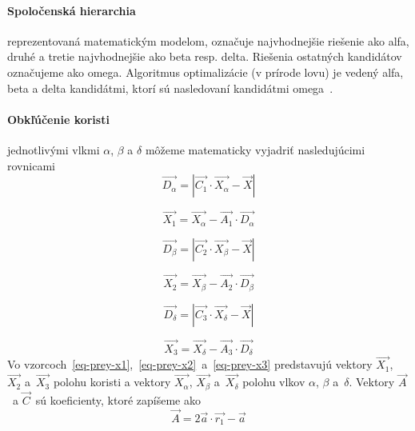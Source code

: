 \documentclass[a4paper,slovak,12pt,appendix]{article}
\begin{document}
\paragraph{Spoločenská hierarchia} reprezentovaná matematickým modelom,
označuje najvhodnejšie riešenie ako alfa, druhé a tretie najvhodnejšie ako beta
resp. delta. Riešenia ostatných kandidátov označujeme ako omega. Algoritmus
optimalizácie (v prírode lovu) je vedený alfa, beta a delta kandidátmi, ktorí
sú nasledovaní kandidátmi omega~\cite{Seeley1991}.

\paragraph{Obkľúčenie koristi} jednotlivými vlkmi $\alpha$, $\beta$ a $\delta$
môžeme matematicky vyjadriť nasledujúcimi rovnicami
\begin{equation}
  \vec{D_\alpha} = | \vec{C_1} \cdot \vec{X_\alpha} - \vec{X} |
  \label{eq-prey-alpha}
\end{equation}

\begin{equation}
  \vec{X_1} = \vec{X_\alpha} - \vec{A_1} \cdot \vec{D_\alpha}
  \label{eq-prey-x1}
\end{equation}

\begin{equation}
  \vec{D_\beta} = | \vec{C_2} \cdot \vec{X_\beta} - \vec{X} |
  \label{eq-prey-beta}
\end{equation}

\begin{equation}
  \vec{X_2} = \vec{X_\beta} - \vec{A_2} \cdot \vec{D_\beta}
  \label{eq-prey-x2}
\end{equation}

\begin{equation}
  \vec{D_\delta} = | \vec{C_3} \cdot \vec{X_\delta} - \vec{X} |
  \label{eq-prey-delta}
\end{equation}

\begin{equation}
  \vec{X_3} = \vec{X_\delta} - \vec{A_3} \cdot \vec{D_\delta}
  \label{eq-prey-x3}
\end{equation}
Vo vzorcoch~\ref{eq-prey-x1},~\ref{eq-prey-x2}~a~\ref{eq-prey-x3} predstavujú
vektory $\vec{X_1}$, $\vec{X_2}$ a $\vec{X_3}$ polohu koristi a vektory
$\vec{X_\alpha}$, $\vec{X_\beta}$ a $\vec{X_\delta}$ polohu vlkov
$\alpha$, $\beta$ a $\delta$. Vektory $\vec{A}$ a $\vec{C}$ sú koeficienty,
ktoré zapíšeme ako
\begin{equation}
  \vec{A} = 2\vec{a} \cdot \vec{r_1} - \vec{a}
  \label{eq-prey-a}
\end{equation}
\end{document}
